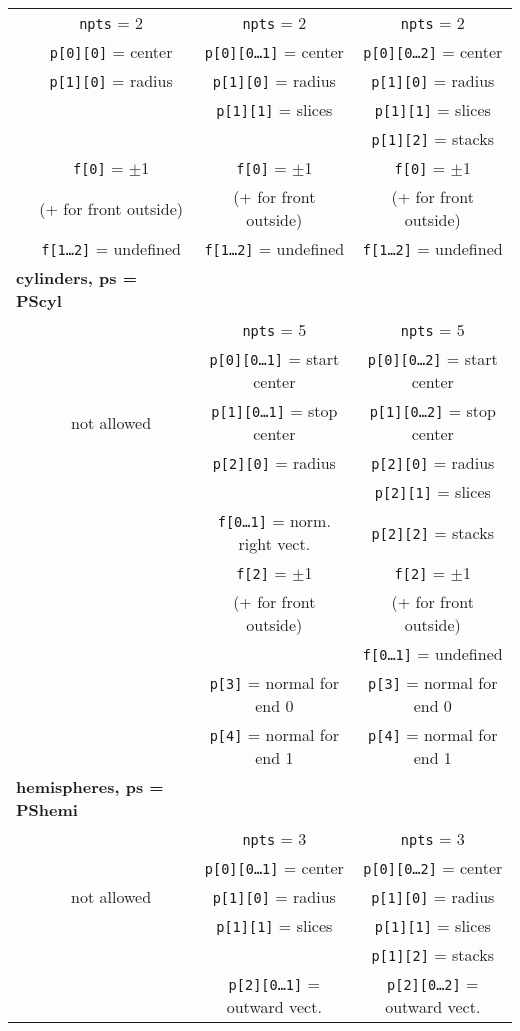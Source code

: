 \documentclass {book}
\newcommand {\ttt} {\texttt}
\begin{document}
\begin{longtable}[c]{lccc}
&\ttt{npts} = 2&\ttt{npts} = 2&\ttt{npts} = 2\\ 
&\ttt{p[0][0]} = center&\ttt{p[0][0\ldots1]} = center&\ttt{p[0][0\ldots2]} = center\\ 
&\ttt{p[1][0]} = radius&\ttt{p[1][0]} = radius&\ttt{p[1][0]} = radius\\ 
&&\ttt{p[1][1]} = slices&\ttt{p[1][1]} = slices\\ 
&&&\ttt{p[1][2]} = stacks\\ 
&\ttt{f[0]} = $\pm$1&\ttt{f[0]} = $\pm$1&\ttt{f[0]} = $\pm$1\\ 
&(+ for front outside)&(+ for front outside)&(+ for front outside)\\ 
&\ttt{f[1\ldots2]} = undefined&\ttt{f[1\ldots2]} = undefined&\ttt{f[1\ldots2]} = undefined\\
\hline
\multicolumn{2}{l}{\textbf{cylinders, ps = PScyl}}\\
&&\ttt{npts} = 5&\ttt{npts} = 5\\ 
&&\ttt{p[0][0\ldots1]} = start center&\ttt{p[0][0\ldots2]} = start center\\ 
&not allowed&\ttt{p[1][0\ldots1]} = stop center&\ttt{p[1][0\ldots2]} = stop center\\ 
&&\ttt{p[2][0]} = radius&\ttt{p[2][0]} = radius\\ 
&&&\ttt{p[2][1]} = slices\\ 
&&\ttt{f[0\ldots1]} = norm. right vect.&\ttt{p[2][2]} = stacks\\ 
&&\ttt{f[2]} = $\pm$1&\ttt{f[2]} = $\pm$1\\ 
&&(+ for front outside)&(+ for front outside)\\ 
&&&\ttt{f[0\ldots1]} = undefined\\
&&\ttt{p[3]} = normal for end 0&\ttt{p[3]} = normal for end 0\\
&&\ttt{p[4]} = normal for end 1&\ttt{p[4]} = normal for end 1\\
\hline
\multicolumn{2}{l}{\textbf{hemispheres, ps = PShemi}}\\
&&\ttt{npts} = 3&\ttt{npts} = 3\\ 
&&\ttt{p[0][0\ldots1]} = center&\ttt{p[0][0\ldots2]} = center\\ 
&not allowed&\ttt{p[1][0]} = radius&\ttt{p[1][0]} = radius\\ 
&&\ttt{p[1][1]} = slices&\ttt{p[1][1]} = slices\\ 
&&&\ttt{p[1][2]} = stacks\\ 
&&\ttt{p[2][0\ldots1]} = outward vect.&\ttt{p[2][0\ldots2]} = outward vect.\\ 

\end{longtable}
\end{document}
